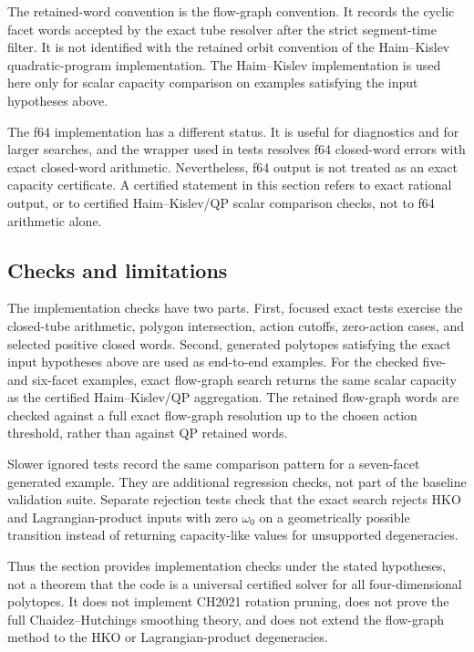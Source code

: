 The retained-word convention is the flow-graph convention.  It records the
cyclic facet words accepted by the exact tube resolver after the strict
segment-time filter.  It is not identified with the retained orbit convention
of the Haim--Kislev quadratic-program implementation.  The Haim--Kislev
implementation is used here only for scalar capacity comparison on examples
satisfying the input hypotheses above.

The f64 implementation has a different status.  It is useful for diagnostics
and for larger searches, and the wrapper used in tests resolves f64
closed-word errors with exact closed-word arithmetic.  Nevertheless, f64 output
is not treated as an exact capacity certificate.  A certified statement in this
section refers to exact rational output, or to certified Haim--Kislev/QP scalar
comparison checks, not to f64 arithmetic alone.

\subsection{Checks and limitations}\label{subsec:flow-graph-algorithm-ch2021-empirical-tests}

The implementation checks have two parts.  First, focused exact tests exercise the
closed-tube arithmetic, polygon intersection, action cutoffs, zero-action
cases, and selected positive closed words.  Second, generated polytopes
satisfying the exact input hypotheses above are used as end-to-end examples.
For the checked five- and six-facet examples, exact flow-graph search returns
the same scalar capacity as the certified Haim--Kislev/QP aggregation.  The
retained flow-graph words are
checked against a full exact flow-graph resolution up to the chosen action
threshold, rather than against QP retained words.

Slower ignored tests record the same comparison pattern for a seven-facet
generated example.  They are additional regression checks, not part of the
baseline validation suite.  Separate rejection tests check that the exact
search rejects HKO and Lagrangian-product inputs with zero \(\omega_0\) on a
geometrically possible transition instead of returning capacity-like values for
unsupported degeneracies.

Thus the section provides implementation checks under the stated hypotheses,
not a theorem that the code is a universal certified solver for all
four-dimensional polytopes.  It does not implement CH2021 rotation pruning,
does not prove the full Chaidez--Hutchings smoothing theory, and does not
extend the flow-graph method to the HKO or Lagrangian-product degeneracies.
